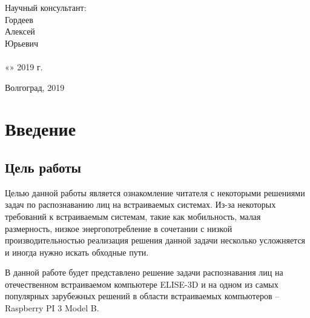 \documentclass[12pt,a4paper]{scrartcl}
\begin{document}
\begin{titlepage}
	\hfill\begin{minipage}{0.4\textwidth}
		Научный консультант:\\
		Гордеев\\
		Алексей \\
		Юрьевич\\
		\underline{\hspace{\ML}} \\[2mm]
		«\underline{\hspace{0.7cm}}» \underline{\hspace{2.5cm}} 2019 г.
	\end{minipage}
	
	\vfill
	
	\begin{center}
	  Волгоград, 2019
	\end{center}

\end{titlepage}

\tableofcontents
\newpage

\section{Введение}

	\subsection{Цель работы}
	
		Целью данной работы является ознакомление читателя с некоторыми решениями задач по распознаванию лиц на встраиваемых системах. Из-за некоторых требований к встраиваемым системам, такие как мобильность, малая размерность, низкое энергопотребление в сочетании с низкой производительностью реализация решения данной задачи несколько усложняется и иногда нужно искать обходные пути. 
		
		В данной работе будет представлено решение задачи распознавания лиц на отечественном встраиваемом компьютере ELISE-3D и на одном из самых популярных зарубежных решений в области встраиваемых компьютеров – Raspberry PI 3 Model B.

	
		
\end{document}
